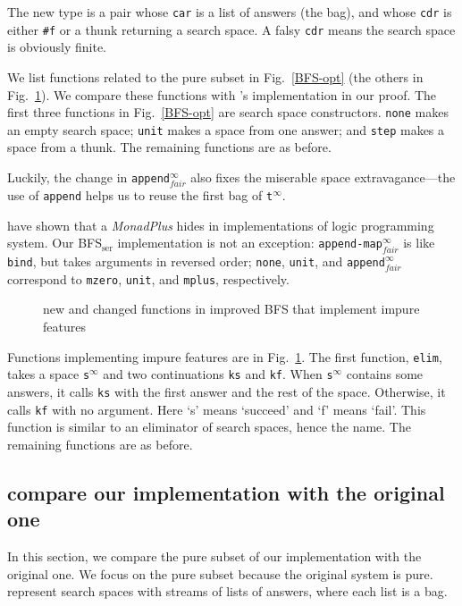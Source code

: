 \documentclass[format=acmlarge, review=true, authordraft=true]{acmart}
\newcommand{\BFSser}[0]{BFS$_\textrm{ser}$}
\begin{document}
The new type is a pair whose \texttt{car} is a list of answers (the bag), and 
whose \texttt{cdr} is either \texttt{\#{}f} or a thunk returning a search 
space. A falsy \texttt{cdr} means the search space is obviously finite. 

We list functions related to the pure subset in Fig.~\ref{BFS-opt} (the 
others in Fig.~\ref{BFS-opt-cont}). We compare these functions with 
\citeauthor{seres1999algebra}'s implementation in our proof. The first three 
functions in Fig.~\ref{BFS-opt} are search space constructors. \texttt{none} 
makes an empty search space; \texttt{unit} makes a space from one answer; and 
\texttt{step} makes a space from a thunk. The remaining functions are as before.

Luckily, the change in \texttt{append$^\infty_{fair}$} also fixes the miserable 
space 
extravagance---the use of \texttt{append} helps us to reuse the first bag of 
\texttt{t$^\infty$}.

\citet{kiselyov2005backtracking} have shown that a \emph{MonadPlus} hides in 
implementations of logic programming system. Our \BFSser{} implementation is 
not an exception: \texttt{append-map$^\infty_{fair}$} is like \texttt{bind}, 
but takes arguments in reversed order; \texttt{none}, \texttt{unit}, and 
\texttt{append$^\infty_{fair}$} correspond to \texttt{mzero}, \texttt{unit}, 
and \texttt{mplus}, respectively.

\begin{figure}
		
	\caption{new and changed functions in improved BFS that implement impure 
		features}
	\label{BFS-opt-cont}
\end{figure}

Functions implementing impure features are in Fig.~\ref{BFS-opt-cont}. The 
first function, \texttt{elim}, takes a space \texttt{s$^\infty$} and two 
continuations \texttt{ks} and \texttt{kf}. When \texttt{s$^\infty$} contains 
some 
answers, it calls \texttt{ks} with the first answer and the rest of the space. 
Otherwise, it calls \texttt{kf} with no argument. Here `s' means
`succeed' and `f' means `fail'. This function is similar to an eliminator of 
search spaces, hence the name. The remaining functions are as before.

\subsection{compare our implementation with the original one}

In this section, we compare the pure subset of our implementation with the 
original one. We focus on the pure subset because the original system is pure.
\citeauthor{seres1999algebra} represent search spaces with streams of 
lists of answers, where each list is a bag.
\end{document}
